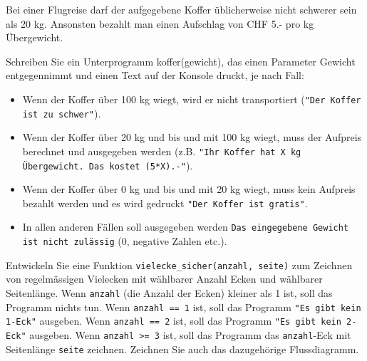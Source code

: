 \begin{myexercise}
	Bei einer Flugreise darf der aufgegebene Koffer üblicherweise nicht schwerer sein als 20 kg. Ansonsten bezahlt man einen Aufschlag von CHF 5.- pro kg Übergewicht.

	Schreiben Sie ein Unterprogramm koffer(gewicht), das einen Parameter Gewicht entgegennimmt und einen Text auf der Konsole druckt, je nach Fall:

	\begin{itemize}
		\item Wenn der Koffer über 100 kg wiegt, wird er nicht transportiert (\lstinline|"Der Koffer ist zu schwer"|).
		\item Wenn der Koffer über 20 kg und bis und mit 100 kg wiegt, muss der Aufpreis berechnet und ausgegeben werden (z.B. \lstinline|"Ihr Koffer hat X kg Übergewicht. Das kostet (5*X).-"|).
		\item Wenn der Koffer über 0 kg und bis und mit 20 kg wiegt, muss kein Aufpreis bezahlt werden und es wird gedruckt \lstinline|"Der Koffer ist gratis"|.
		\item  In allen anderen Fällen soll ausgegeben werden \lstinline|Das eingegebene Gewicht ist nicht zulässig| (0, negative Zahlen etc.).
	\end{itemize}
	\begin{myanswer}
		
	\end{myanswer}
\end{myexercise}

\begin{myexercise}
	Entwickeln Sie eine Funktion \lstinline|vielecke_sicher(anzahl, seite)| zum Zeichnen von regelmässigen Vielecken mit wählbarer Anzahl Ecken und wählbarer Seitenlänge. Wenn \lstinline|anzahl| (die Anzahl der Ecken) kleiner als 1 ist, soll das Programm nichts tun. Wenn \lstinline|anzahl == 1| ist, soll das Programm
	\lstinline|"Es gibt kein 1-Eck"| ausgeben. Wenn \lstinline|anzahl == 2| ist, soll das Programm
	\lstinline|"Es gibt kein 2-Eck"| ausgeben. Wenn \lstinline|anzahl >= 3| ist, soll das Programm das \lstinline|anzahl|-Eck mit Seitenlänge \lstinline|seite| zeichnen. Zeichnen Sie auch das dazugehörige Flussdiagramm.
	\begin{myanswer}
		
	\end{myanswer}
\end{myexercise}

